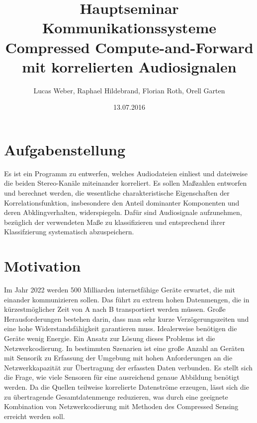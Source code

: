 \documentclass[a4paper, 11pt]{article}
\begin{document}
\title{Hauptseminar Kommunikationssysteme \\ Compressed Compute-and-Forward mit korrelierten Audiosignalen}
\date{13.07.2016}
\author{Lucas Weber, Raphael Hildebrand, Florian Roth, Orell Garten}



\maketitle
\newpage

\tableofcontents
\newpage



\section{Aufgabenstellung}
Es ist ein Programm zu entwerfen, welches Audiodateien einliest und dateiweise die beiden Stereo-Kanäle miteinander korreliert. Es sollen Maßzahlen entworfen und berechnet werden, die wesentliche charakteristische Eigenschaften der Korrelationsfunktion, insbesondere den Anteil dominanter Komponenten und deren Abklingverhalten, widerspiegeln. Dafür sind Audiosignale aufzunehmen, bezüglich der verwendeten Maße zu klassifizieren und entsprechend ihrer Klassifzierung systematisch abzuspeichern.
\section{Motivation}
Im Jahr 2022 werden 500 Milliarden internetfähige Geräte erwartet, die mit einander kommunizieren sollen. Das führt zu extrem hohen Datenmengen, die in kürzestmöglicher Zeit von A nach B transportiert werden müssen. Große Herausforderungen bestehen darin, dass man sehr kurze Verzögerungszeiten und eine hohe Widerstandsfähigkeit garantieren muss. Idealerweise benötigen die Geräte wenig Energie. Ein Ansatz zur Lösung dieses Problems ist die Netzwerkcodierung.\newline
In bestimmten Szenarien ist eine große Anzahl an Geräten mit Sensorik zu Erfassung der Umgebung mit hohen Anforderungen an die Netzwerkkapazität zur Übertragung der erfassten Daten verbunden. Es stellt sich die Frage, wie viele Sensoren für eine ausreichend genaue Abbildung benötigt werden. Da die Quellen teilweise korrelierte Datenströme erzeugen, lässt sich die zu übertragende Gesamtdatenmenge reduzieren, was durch eine geeignete Kombination von Netzwerkcodierung mit Methoden des Compressed Sensing erreicht werden soll.
\end{document}
